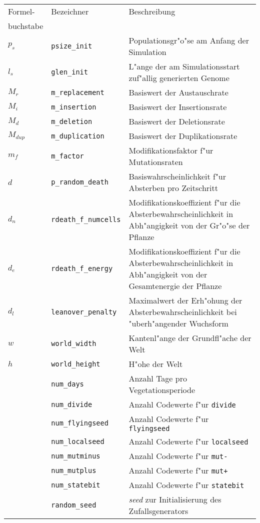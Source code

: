 \begin{table}[tb]

\noindent\begin{tabularx}{\linewidth}{|l|l|X|} \hline
Formel- & Bezeichner              & Beschreibung \\
buchstabe &                       & \\ \hline
$p_s$ & \verb|psize_init|         & Populationsgr"o"se am Anfang der Simulation \\
$l_s$ & \verb|glen_init|          & L"ange der am Simulationsstart zuf"allig generierten Genome \\
$M_r$ & \verb|m_replacement|      & Basiswert der Austauschrate \\
$M_i$ & \verb|m_insertion|        & Basiswert der Insertionsrate \\
$M_d$ & \verb|m_deletion|         & Basiswert der Deletionsrate \\
$M_{\mathit{dup}}$ & \verb|m_duplication| & Basiswert der Duplikationsrate \\
$m_f$ & \verb|m_factor|           & Modifikationsfaktor f"ur Mutationsraten \\
$d$   & \verb|p_random_death|     & Basiswahrscheinlichkeit f"ur Absterben pro Zeitschritt \\
$d_n$ & \verb|rdeath_f_numcells|  & Modifikationskoeffizient f"ur die Absterbewahrscheinlichkeit
                                    in Abh"angigkeit von der Gr"o"se der Pflanze \\
$d_e$ & \verb|rdeath_f_energy|    & Modifikationskoeffizient f"ur die Absterbewahrscheinlichkeit
                                    in Abh"angigkeit von der Gesamtenergie der Pflanze \\
$d_l$ & \verb|leanover_penalty|   & Maximalwert der Erh"ohung der Absterbewahrscheinlichkeit
                                    bei "uberh"angender Wuchsform \\
$w$   & \verb|world_width|        & Kantenl"ange der Grundfl"ache der Welt \\
$h$   & \verb|world_height|       & H"ohe der Welt \\
      & \verb|num_days|           & Anzahl Tage pro Vegetationsperiode \\
      & \verb|num_divide|         & Anzahl Codewerte f"ur \verb|divide| \\
      & \verb|num_flyingseed|     & Anzahl Codewerte f"ur \verb|flyingseed| \\
      & \verb|num_localseed|      & Anzahl Codewerte f"ur \verb|localseed| \\
      & \verb|num_mutminus|       & Anzahl Codewerte f"ur \verb|mut-| \\
      & \verb|num_mutplus|        & Anzahl Codewerte f"ur \verb|mut+| \\
      & \verb|num_statebit|       & Anzahl Codewerte f"ur \verb|statebit| \\
      & \verb|random_seed|        & {\slshape seed} zur Initialisierung des Zufallsgenerators \\ \hline
\end{tabularx}


\end{table}
